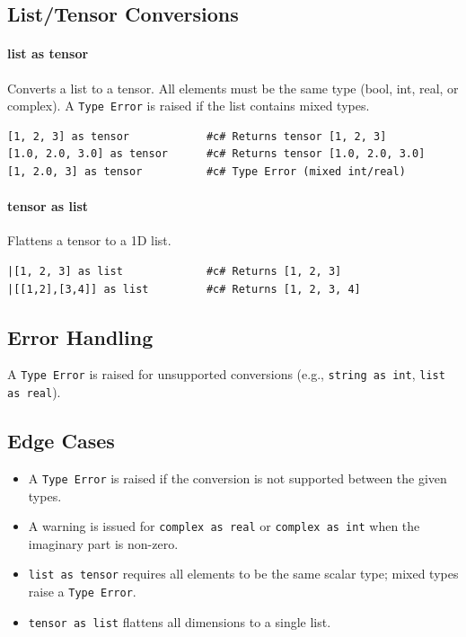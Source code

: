 \subsection{List/Tensor Conversions}

\paragraph{list as tensor}
Converts a list to a tensor. All elements must be the same type (bool, int, real, or complex). A \texttt{Type Error} is raised if the list contains mixed types.
\begin{verbatim}
[1, 2, 3] as tensor            #c# Returns tensor [1, 2, 3]
[1.0, 2.0, 3.0] as tensor      #c# Returns tensor [1.0, 2.0, 3.0]
[1, 2.0, 3] as tensor          #c# Type Error (mixed int/real)
\end{verbatim}

\paragraph{tensor as list}
Flattens a tensor to a 1D list.
\begin{verbatim}
|[1, 2, 3] as list             #c# Returns [1, 2, 3]
|[[1,2],[3,4]] as list         #c# Returns [1, 2, 3, 4]
\end{verbatim}

\subsection{Error Handling}
A \texttt{Type Error} is raised for unsupported conversions (e.g., \texttt{string as int}, \texttt{list as real}).

\subsection{Edge Cases}
\begin{itemize}
\item A \texttt{Type Error} is raised if the conversion is not supported between the given types.
\item A warning is issued for \texttt{complex as real} or \texttt{complex as int} when the imaginary part is non-zero.
\item \texttt{list as tensor} requires all elements to be the same scalar type; mixed types raise a \texttt{Type Error}.
\item \texttt{tensor as list} flattens all dimensions to a single list.
\end{itemize}


